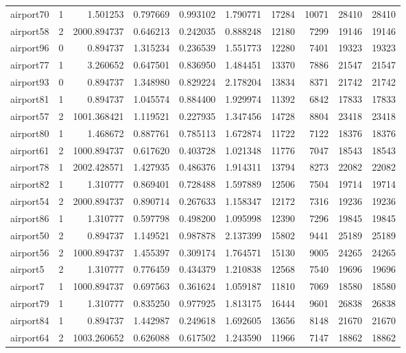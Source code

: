 \begin{longtable}{|l|r|r|r|r|r|r|r|r|r|}
airport70 & 1 & 1.501253 & 0.797669 & 0.993102 & 1.790771 & 17284 & 10071 & 28410 & 28410 \\
airport58 & 2 & 2000.894737 & 0.646213 & 0.242035 & 0.888248 & 12180 & 7299 & 19146 & 19146 \\
airport96 & 0 & 0.894737 & 1.315234 & 0.236539 & 1.551773 & 12280 & 7401 & 19323 & 19323 \\
airport77 & 1 & 3.260652 & 0.647501 & 0.836950 & 1.484451 & 13370 & 7886 & 21547 & 21547 \\
airport93 & 0 & 0.894737 & 1.348980 & 0.829224 & 2.178204 & 13834 & 8371 & 21742 & 21742 \\
airport81 & 1 & 0.894737 & 1.045574 & 0.884400 & 1.929974 & 11392 & 6842 & 17833 & 17833 \\
airport57 & 2 & 1001.368421 & 1.119521 & 0.227935 & 1.347456 & 14728 & 8804 & 23418 & 23418 \\
airport80 & 1 & 1.468672 & 0.887761 & 0.785113 & 1.672874 & 11722 & 7122 & 18376 & 18376 \\
airport61 & 2 & 1000.894737 & 0.617620 & 0.403728 & 1.021348 & 11776 & 7047 & 18543 & 18543 \\
airport78 & 1 & 2002.428571 & 1.427935 & 0.486376 & 1.914311 & 13794 & 8273 & 22082 & 22082 \\
airport82 & 1 & 1.310777 & 0.869401 & 0.728488 & 1.597889 & 12506 & 7504 & 19714 & 19714 \\
airport54 & 2 & 2000.894737 & 0.890714 & 0.267633 & 1.158347 & 12172 & 7316 & 19236 & 19236 \\
airport86 & 1 & 1.310777 & 0.597798 & 0.498200 & 1.095998 & 12390 & 7296 & 19845 & 19845 \\
airport50 & 2 & 0.894737 & 1.149521 & 0.987878 & 2.137399 & 15802 & 9441 & 25189 & 25189 \\
airport56 & 2 & 1000.894737 & 1.455397 & 0.309174 & 1.764571 & 15130 & 9005 & 24265 & 24265 \\
airport5 & 2 & 1.310777 & 0.776459 & 0.434379 & 1.210838 & 12568 & 7540 & 19696 & 19696 \\
airport7 & 1 & 1000.894737 & 0.697563 & 0.361624 & 1.059187 & 11810 & 7069 & 18580 & 18580 \\
airport79 & 1 & 1.310777 & 0.835250 & 0.977925 & 1.813175 & 16444 & 9601 & 26838 & 26838 \\
airport84 & 1 & 0.894737 & 1.442987 & 0.249618 & 1.692605 & 13656 & 8148 & 21670 & 21670 \\
airport64 & 2 & 1003.260652 & 0.626088 & 0.617502 & 1.243590 & 11966 & 7147 & 18862 & 18862 \\

\end{longtable}
